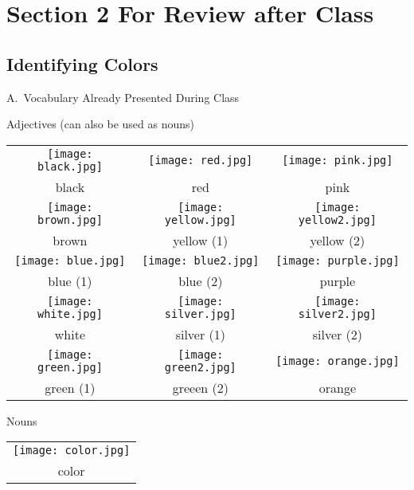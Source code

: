 \documentclass{tufte-book}
\begin{document}
\newpage
\section{Section 2 For Review after Class}
\subsection{Identifying Colors}

\noindent A.~Vocabulary Already Presented During Class

\vspace{0.25cm} \noindent Adjectives (can also be used as nouns)

\begin{table*}[h!]
\begin{tabular}{c c c}
\texttt{[image: black.jpg]}&\texttt{[image: red.jpg]}&\texttt{[image: pink.jpg]}\\
\footnotesize black & \footnotesize red & \footnotesize pink\\
\texttt{[image: brown.jpg]}&\texttt{[image: yellow.jpg]}&\texttt{[image: yellow2.jpg]}\\
\footnotesize brown & \footnotesize yellow (1) & \footnotesize yellow (2)\\
\texttt{[image: blue.jpg]}&\texttt{[image: blue2.jpg]}&\texttt{[image: purple.jpg]}\\
\footnotesize blue (1) & \footnotesize blue (2) & \footnotesize purple\\
\texttt{[image: white.jpg]}&\texttt{[image: silver.jpg]}&\texttt{[image: silver2.jpg]}\\
\footnotesize white & \footnotesize silver (1) & \footnotesize silver (2)\\
\texttt{[image: green.jpg]}&\texttt{[image: green2.jpg]}&\texttt{[image: orange.jpg]}\\
\footnotesize green (1) & \footnotesize greeen (2) & \footnotesize orange\\

\end{tabular}
\end{table*}
\newpage
\noindent Nouns

\begin{table*}[h!]
\begin{tabular}{c}
\texttt{[image: color.jpg]}\\
\footnotesize color\\
\end{tabular}
\end{table*}
\end{document}
